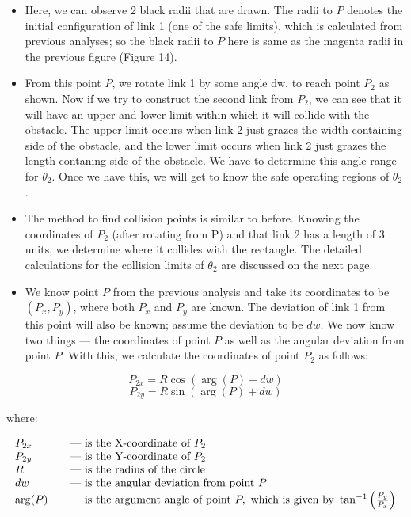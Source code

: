 \documentclass[12pt]{article}
\begin{document}
\begin{itemize}
    \item Here, we can observe 2 black radii that are drawn. The radii to $P$ denotes the initial configuration of link 1 (one of the safe limits), which is calculated from previous analyses; so the black radii to $P$ here is same as the magenta radii in the previous figure (Figure 14).
    
    \item From this point $P$, we rotate link 1 by some angle dw, to reach point $P_2$ as shown. Now if we try to construct the second link from $P_2$, we can see that it will have an upper and lower limit within which it will collide with the obstacle. The upper limit occurs when link 2 just grazes the width-containing side of the obstacle, and the lower limit occurs when link 2 just grazes the length-contaning side of the obstacle. We have to determine this angle range for $\theta_2$. Once we have this, we will get to know the safe operating regions of $\theta_2$.

    \item The method to find collision points is similar to before. Knowing the coordinates of $P_2$ (after rotating from P) and that link 2 has a length of 3 units, we determine where it collides with the rectangle. The detailed calculations for the collision limits of $\theta_2$ are discussed on the next page.
    
    \item We know point \(P\) from the previous analysis and take its coordinates to be \((P_x, P_y)\), where both \(P_x\) and \(P_y\) are known. The deviation of link 1 from this point will also be known; assume the deviation to be \(dw\). We now know two things — the coordinates of point \(P\) as well as the angular deviation from point \(P\). With this, we calculate the coordinates of point \(P_2\) as follows:
\end{itemize}

\[
P_{2x} = R \cos(\arg(P)+dw)
\]
\[
P_{2y} = R \sin(\arg(P)+dw)
\]

where:

\[
\begin{array}{l l}
P_{2x}  & \quad \text{--- is the X-coordinate of } P_2 \\
P_{2y}  & \quad \text{--- is the Y-coordinate of } P_2 \\
R       & \quad \text{--- is the radius of the circle} \\
dw      & \quad \text{--- is the angular deviation from point } P \\
\arg(P) & \quad \text{--- is the argument angle of point } P, \text{ which is given by } \tan^{-1} \left( \frac{P_y}{P_x} \right)
\end{array}
\]
\end{document}
